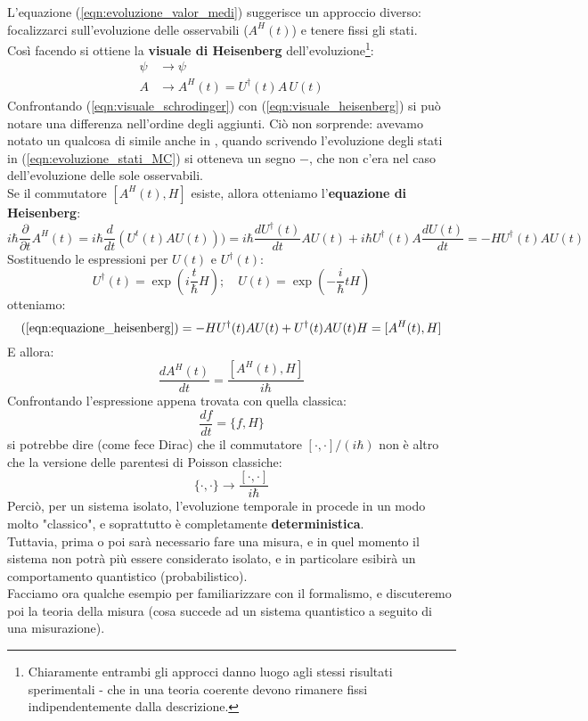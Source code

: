 \documentclass[../../FisicaTeorica.tex]{subfiles}
\begin{document}
L'equazione (\ref{eqn:evoluzione_valor_medi}) suggerisce un approccio diverso: focalizzarci sull'evoluzione delle osservabili ($A^H(t)$) e tenere fissi gli stati.\\
Così facendo si ottiene la \textbf{visuale di Heisenberg} dell'evoluzione\footnote{Chiaramente entrambi gli approcci danno luogo agli stessi risultati sperimentali - che in una teoria coerente devono rimanere fissi indipendentemente dalla descrizione.}:
\begin{align}
    \psi &\to \psi
    \label{eqn:visuale_heisenberg}
    \\
    A &\to A^H(t)=U^\dag (t)A\,U(t)
    \nonumber
\end{align}
Confrontando (\ref{eqn:visuale_schrodinger}) con (\ref{eqn:visuale_heisenberg}) si può notare una differenza nell'ordine degli aggiunti. Ciò non sorprende: avevamo notato un qualcosa di simile anche in \MC, quando scrivendo l'evoluzione degli stati in (\ref{eqn:evoluzione_stati_MC}) si otteneva un segno $-$, che non c'era nel caso dell'evoluzione delle sole osservabili.\\
Se il commutatore $[A^H(t), H]$ esiste, allora otteniamo l'\textbf{equazione di Heisenberg}:
\begin{equation}
i\hbar \frac{\partial}{\partial t}A^H(t) = i\hbar \frac{d}{dt}(U^t(t)AU(t))
) = i\hbar \frac{dU^\dag(t)}{dt}AU(t)+i\hbar U^\dag(t)A\frac{dU(t)}{dt} = -HU^\dag(t)AU(t)
\label{eqn:equazione_heisenberg}
\end{equation}
Sostituendo le espressioni per $U(t)$ e $U^\dag(t)$:
\[
U^\dag(t)=\exp\left(i\frac{t}{\hbar}H\right); \quad U(t)=\exp\left(-\frac{i}{\hbar}tH\right)
\]
otteniamo:
\[
(\ref{eqn:equazione_heisenberg}) = -HU^\dag(t)AU(t)+U^\dag(t)AU(t)H=[A^H(t),H]
\]
E allora:
\[
\frac{dA^H(t)}{dt}=\frac{[A^H(t),H]}{i\hbar}
\]
Confrontando l'espressione appena trovata con quella classica:
\[
\frac{df}{dt}=\{f,H\}
\]
si potrebbe dire (come fece Dirac) che il commutatore $[\cdot,\cdot]/(i\hbar)$ non è altro che la versione  delle parentesi di Poisson classiche:
\[
\{\cdot,\cdot\} \to \frac{[\cdot,\cdot]}{i\hbar}
\]
Perciò, per un sistema isolato, l'evoluzione temporale in \MQ procede in un modo molto "classico", e soprattutto è completamente \textbf{deterministica}.\\
Tuttavia, prima o poi sarà necessario fare una misura, e in quel momento il sistema non potrà più essere considerato isolato, e in particolare esibirà un comportamento quantistico (probabilistico).\\
Facciamo ora qualche esempio per familiarizzare con il formalismo, e discuteremo poi la teoria della misura (cosa succede ad un sistema quantistico a seguito di una misurazione).\\
\end{document}
